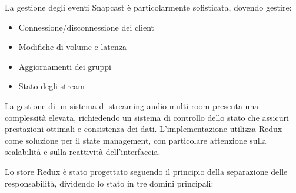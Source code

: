 La gestione degli eventi Snapcast è particolarmente sofisticata, dovendo gestire:

\begin{itemize}
    \item Connessione/disconnessione dei client
    \item Modifiche di volume e latenza
    \item Aggiornamenti dei gruppi
    \item Stato degli stream
\end{itemize}

La gestione di un sistema di streaming audio multi-room presenta una complessità elevata, richiedendo un sistema di controllo dello stato che assicuri prestazioni ottimali e consistenza dei dati. L'implementazione utilizza Redux come soluzione per il state management, con particolare attenzione sulla scalabilità e sulla reattività dell'interfaccia.

Lo store Redux è stato progettato seguendo il principio della separazione delle responsabilità, dividendo lo stato in tre domini principali:

